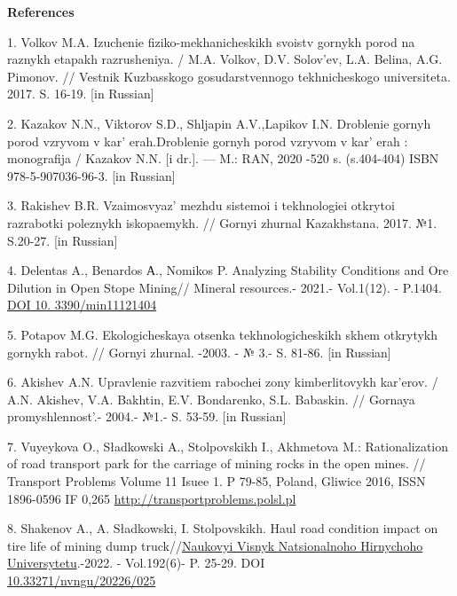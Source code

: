 \begin{center}
{\bfseries References}
\end{center}

\begin{references}
1. Volkov M.A. Izuchenie fiziko-mekhanicheskikh svoistv gornykh porod na
raznykh etapakh razrusheniya. / M.A. Volkov, D.V. Solov'ev, L.A. Belina,
A.G. Pimonov. // Vestnik Kuzbasskogo gosudarstvennogo tekhnicheskogo
universiteta. 2017. S. 16-19. {[}in Russian{]}

2. Kazakov N.N., Viktorov S.D., Shljapin A.V.,Lapikov I.N. Droblenie
gornyh porod vzryvom v kar' erah.Droblenie gornyh porod
vzryvom v kar' erah : monografija / Kazakov N.N. {[}i
dr.{]}. --- M.: RAN, 2020 -520 s. (s.404-404) ISBN 978-5-907036-96-3.
{[}in Russian{]}

3. Rakishev B.R. Vzaimosvyaz' mezhdu sistemoi i tekhnologiei otkrytoi
razrabotki poleznykh iskopaemykh. // Gornyi zhurnal Kazakhstana. 2017.
№1. S.20-27. {[}in Russian{]}

4. Delentas A., Benardos А., Nomikos P. Analyzing Stability Conditions
and Ore Dilution in Open Stope Mining// Mineral resources.- 2021.-
Vol.1(12). - P.1404. \href{https://doi.org/10.3390/min11121404}{DOI
10. 3390/min11121404}

5. Potapov M.G. Ekologicheskaya otsenka tekhnologicheskikh skhem
otkrytykh gornykh rabot. // Gornyi zhurnal. -2003. - № 3.- S. 81-86.
{[}in Russian{]}

6. Akishev A.N. Upravlenie razvitiem rabochei zony kimberlitovykh
kar'erov. / A.N. Akishev, V.A. Bakhtin, E.V. Bondarenko, S.L. Babaskin.
// Gornaya promyshlennost'.- 2004.- №1.- S. 53-59. {[}in Russian{]}

7. Vuyeykova O., Sładkowski A., Stolpovskikh I., Akhmetova M.:
Rationalization of
road transport park for the carriage of mining rocks in the open mines.
// Transport Problems Volume 11 Isuee 1. P 79-85, Poland, Gliwice 2016,
ISSN 1896-0596 IF 0,265
\href{http://transportproblems.polsl.pl/en/default.aspx}{http://transportproblems.polsl.pl}

8. Shakenov A., A. Sładkowski, I. Stolpovskikh. Haul road condition
impact on tire life of mining dump
truck//\href{https://www.researchgate.net/journal/Naukovyi-Visnyk-Natsionalnoho-Hirnychoho-Universytetu-2223-2362?_tp=eyJjb250ZXh0Ijp7ImZpcnN0UGFnZSI6InB1YmxpY2F0aW9uIiwicGFnZSI6InB1YmxpY2F0aW9uIn19}{Naukovyi
Visnyk Natsionalnoho Hirnychoho Universytetu}.-2022. - Vol.192(6)- P.
25-29. DOI\\
\href{http://dx.doi.org/10.33271/nvngu/20226/025}{10.33271/nvngu/20226/025}


\end{references}

